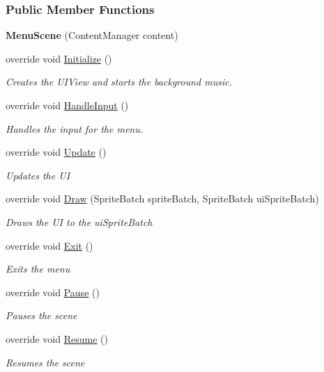 \subsubsection*{Public Member Functions}
\begin{DoxyCompactItemize}
\item 
\hypertarget{class_midnight_blue_1_1_menu_scene_a7f0035320ea63bd527efcdbda32d3f2b}{}\label{class_midnight_blue_1_1_menu_scene_a7f0035320ea63bd527efcdbda32d3f2b} 
{\bfseries Menu\+Scene} (Content\+Manager content)
\item 
override void \hyperlink{class_midnight_blue_1_1_menu_scene_ab46d90617acf2fad0a3c759337c54aaf}{Initialize} ()
\begin{DoxyCompactList}\small\item\em Creates the U\+I\+View and starts the background music. \end{DoxyCompactList}\item 
override void \hyperlink{class_midnight_blue_1_1_menu_scene_a34d30a2b66e9eadbf0889071bca6fa57}{Handle\+Input} ()
\begin{DoxyCompactList}\small\item\em Handles the input for the menu. \end{DoxyCompactList}\item 
override void \hyperlink{class_midnight_blue_1_1_menu_scene_af82ad49ba2744422e52fc6c1b8544255}{Update} ()
\begin{DoxyCompactList}\small\item\em Updates the UI \end{DoxyCompactList}\item 
override void \hyperlink{class_midnight_blue_1_1_menu_scene_a600112073f48c763a50c802960f5fdaa}{Draw} (Sprite\+Batch sprite\+Batch, Sprite\+Batch ui\+Sprite\+Batch)
\begin{DoxyCompactList}\small\item\em Draws the UI to the ui\+Sprite\+Batch \end{DoxyCompactList}\item 
override void \hyperlink{class_midnight_blue_1_1_menu_scene_acc60288dc2dff4d612b7a63615165de5}{Exit} ()
\begin{DoxyCompactList}\small\item\em Exits the menu \end{DoxyCompactList}\item 
override void \hyperlink{class_midnight_blue_1_1_menu_scene_a7a2f8875f949d2ec2e6f3a8c6da7cedf}{Pause} ()
\begin{DoxyCompactList}\small\item\em Pauses the scene \end{DoxyCompactList}\item 
override void \hyperlink{class_midnight_blue_1_1_menu_scene_a76f8bd3add4abf16ac9962a2fb51fad2}{Resume} ()
\begin{DoxyCompactList}\small\item\em Resumes the scene \end{DoxyCompactList}\end{DoxyCompactItemize}


